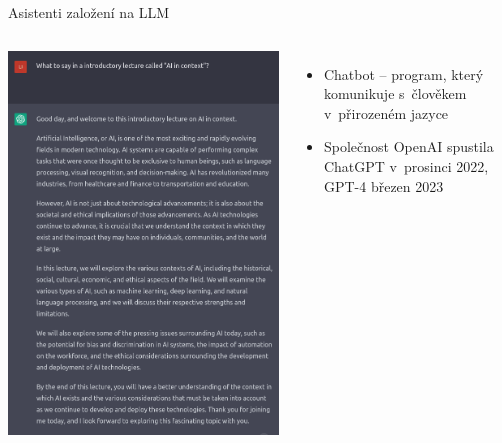 \documentclass[aspectratio=169,dvipsnames]{beamer}
\begin{document}

\begin{frame}{Asistenti založení na LLM}

    \begin{columns}

        \includegraphics[width=\textwidth]{img/ChatGPT.png}

    \begin{itemize}[<+->]

        \item Chatbot -- program, který komunikuje s~člověkem v~přirozeném jazyce

        \item Společnost OpenAI spustila ChatGPT v~prosinci 2022, GPT-4 březen 2023


\end{itemize}
\end{columns}
\end{frame}
\end{document}
